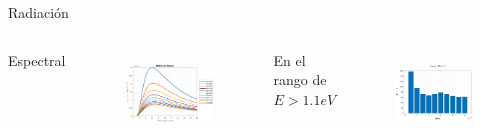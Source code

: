 \documentclass[spanish,a4paper]{beamer}%
\newcommand{\resRadPath}{\graphicspath{{./figuras/Resultados/radiacion/}}}
\begin{document}
		\begin{frame}{Radiación}
			\resRadPath
			\begin{columns}
						\begin{block}{\centering Espectral}
						\end{block}
					\vspace{15pt}
						\begin{figure}[h]%
								\centering
										\includegraphics[width=\columnwidth]{SiSi_ds}
								\label{fig:SiSiO2Si_rad}%
						\end{figure}
						\vfill
					\vspace{-10pt}
						\begin{block}{\centering En el rango de $E>1.1eV$}
							\end{block}
					\vspace{10pt}
						\begin{figure}[h]%
								\centering
										\includegraphics[width=\columnwidth]{p_11_SiSi}%
								\label{fig:SiSiO2Si_radInt}%
						\end{figure}
						\vfill
				\end{columns}		
		\end{frame}
\end{document}
